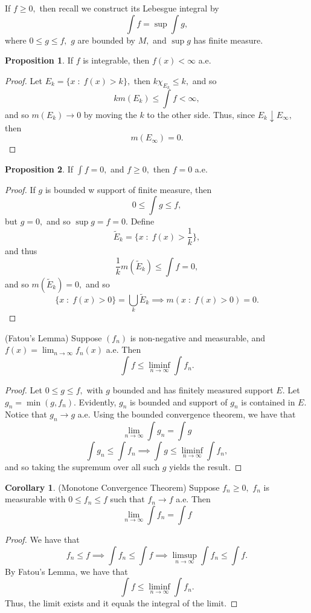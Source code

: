 \documentclass[10pt, oneside]{article}
\theoremstyle{definition}
\newtheorem{prop}{Proposition}
\newtheorem{cor}{Corollary}
\begin{document}
If $f\geq 0,$ then recall we construct its Lebesgue integral by 
\[\int f = \sup \int g,\] where $0\leq g \leq f,$ $g$ are bounded by $M,$ and $\sup g$ has finite measure.

\begin{prop}
    If $f$ is integrable, then $f(x)< \infty$ a.e. 
\end{prop}
\begin{proof}
    Let $E_k = \{x \; : \; f(x) > k\},$ then $k \chi_{E_k} \leq k,$ and so 
    \[k m(E_k) \leq \int f < \infty,\] and so $m(E_k) \to 0$ by moving the $k$ to the other side. Thus, since $E_k \downarrow E_\infty,$ then
    \[m(E_\infty) = 0.\]
\end{proof}
\begin{prop}
    If $\int f = 0,$ and $f\geq 0,$ then $f = 0$ a.e.
\end{prop}
\begin{proof}
    If $g$ is bounded w support of finite measure, then 
    \[0 \leq \int g \leq f,\] but $g = 0,$ and so $\sup g = f = 0.$ Define 
    \[\widetilde{E}_k = \{x \; : \; f(x) > \frac{1}{k}\},\] and thus 
    \[\frac{1}{k}m(\tilde{E}_k) \leq \int f = 0,\] and so $m(\widetilde{E}_k) = 0,$ and so 
    \[\{x \; : \; f(x) >0\} = \bigcup_k \widetilde{E}_k \implies m(x \; : \; f(x)>0) = 0.\]
\end{proof}


\begin{lemma}
    (Fatou's Lemma) Suppose $(f_n)$ is non-negative and measurable, and $f(x) = \lim_{n\to \infty}f_n(x)$ a.e. Then 
    \[\int f \leq \liminf_{n\to \infty}\int f_n.\]
\end{lemma}
\begin{proof}
    Let $0\leq g \leq f,$ with $g$ bounded and has finitely measured support $E$. Let $g_n = \min(g, f_n).$ Evidently, $g_n$ is bounded and support of $g_n$ is contained in $E.$ Notice that $g_n \to g$ a.e. Using the bounded convergence theorem, we have that 
    \[\lim_{n\to \infty} \int g_n = \int g\]
    \[\int g_n \leq \int f_n \implies \int g \leq \liminf_{n\to \infty}\int f_n,\] and so taking the supremum over all such $g$ yields the result.
\end{proof}

\begin{cor} (Monotone Convergence Theorem)
    Suppose $f_n\geq 0,$ $f_n$ is measurable with $0 \leq f_n\leq f$ such that $f_n \to f$ a.e. Then 
    \[\lim_{n\to \infty} \int f_n = \int f\]
\end{cor}
\begin{proof}
    We have that 
    \[f_n \leq f \implies \int f_n \leq \int f \implies \limsup_{n\to \infty} \int f_n \leq \int f.\] By Fatou's Lemma, we have that 
    \[\int f \leq \liminf_{n\to \infty}\int f_n.\] Thus, the limit exists and it equals the integral of the limit. 
\end{proof}
\end{document}
